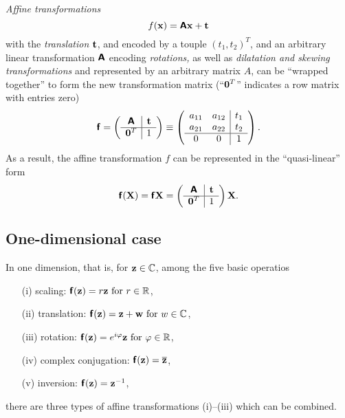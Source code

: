 {\em Affine transformations}
\begin{equation}
f({\bf x})
=   \textsf{\textbf{A}}{\bf x} + {\bf t}
\end{equation}
with the {\em translation}
  ${\bf t}$, and encoded by a touple $(t_1,t_2)^T$,
and an arbitrary linear transformation
$\textsf{\textbf{A}}$
encoding {\em rotations,} as well as {\em dilatation  and skewing transformations}
and represented by an arbitrary matrix $A$,
can be ``wrapped together'' to form the new transformation matrix
(``${\bf 0}^T$'' indicates a row matrix with entries zero)
\begin{equation}
\textsf{\textbf{f}}=
\left(
\begin{array}{c|cccc}
\textsf{\textbf{A}}&{\bf t}\\
\hline
{\bf 0}^T&1
\end{array}
\right)
\equiv
\left(
\begin{array}{cc|ccc}
a_{11}&a_{12}&{t}_1\\
a_{21}&a_{22}&{t}_2\\
\hline
0&0&1
\end{array}
\right)
.
\end{equation}
As a result, the affine transformation $f$ can be represented in the ``quasi-linear'' form
\begin{equation}
\textsf{\textbf{f}}({\bf X})
=
\textsf{\textbf{f}}{\bf X}
=
\left(
\begin{array}{c|cccc}
\textsf{\textbf{A}}&{\bf t}\\
\hline
{\bf 0}^T&1
\end{array}
\right)
{\bf X}
.
\end{equation}

\subsection{One-dimensional case}
In {one dimension}, that is,  for ${\bf z}\in {\Bbb C}$, among the five basic operatios
\begin{itemize}
\item[(i)] scaling:  $\textsf{\textbf{f}}({\bf z}) = r  {\bf z}  \textrm{ for } r\in {\Bbb R}$,
\item[(ii)] translation:  $\textsf{\textbf{f}}({\bf z}) = {\bf z} + {\bf w}  \textrm{ for } w\in {\Bbb C}$,
\item[(iii)] rotation: $ \textsf{\textbf{f}}({\bf z}) = e^{i\varphi}{\bf z}    \textrm{ for } \varphi\in {\Bbb R}$,
\item[(iv)] complex conjugation: $\textsf{\textbf{f}}({\bf z}) = \overline{{\bf z}}$,
\item[(v)] inversion: $\textsf{\textbf{f}}({\bf z}) = {\bf z}^{-1}$,
\end{itemize}
there are three types of
affine transformations (i)--(iii)  which can be combined.

